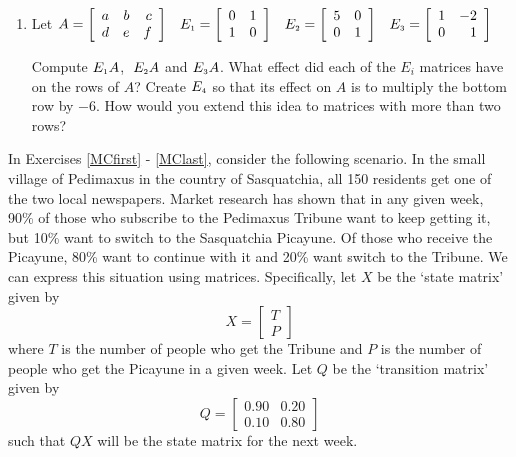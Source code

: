 \documentclass{ximera}
\begin{document}
\begin{enumerate}
\setcounter{enumi}{\value{HW}}

\item Let $A = \left[ \begin{array}{rrr} a & b & c \\ d & e & f \end{array} \right] \;\;\; E_{\mbox{\tiny$1$}} = \left[ \begin{array}{rr} 0 & 1 \\ 1 & 0 \end{array} \right] \;\;\; E_{\mbox{\tiny$2$}} = \left[ \begin{array}{rr} 5 & 0 \\ 0 & 1 \end{array} \right] \;\;\; E_{\mbox{\tiny$3$}} = \left[ \begin{array}{rr} 1 & -2 \\ 0 & 1 \end{array} \right]$ 

\smallskip

 Compute $E_{\mbox{\tiny$1$}}A$, $\; E_{\mbox{\tiny$2$}}A$ and $E_{\mbox{\tiny$3$}}A$.  What effect did each of the $E_{i}$ matrices have on the rows of $A$?  Create $E_{\mbox{\tiny$4$}}$ so that its effect on $A$ is to multiply the bottom row by $-6$.  How would you extend this idea to matrices with more than two rows?
\setcounter{HW}{\value{enumi}}
\end{enumerate}

\label{Markovchain} 

In Exercises \ref{MCfirst} - \ref{MClast}, consider the following scenario. In the small village of Pedimaxus in the country of Sasquatchia, all 150 residents get one of the two local newspapers.  Market research has shown that in any given week, 90\% of those who subscribe to the Pedimaxus Tribune want to keep getting it, but 10\% want to switch to the Sasquatchia Picayune.  Of those who receive the Picayune, 80\% want to continue with it and 20\% want switch to the Tribune.  We can express this situation using matrices.  Specifically, let $X$ be the `state matrix' given by \[X = \left[ \begin{array}{r} T \\ P \end{array} \right]\] where $T$ is the number of people who get the Tribune and $P$ is the number of people who get the Picayune in a given week.  Let $Q$ be the `transition matrix' given by \[Q = \left[ \begin{array}{rr} 0.90 & 0.20 \\ 0.10 & 0.80 \end{array} \right]\] such that $QX$ will be the state matrix for the next week. 
\end{document}
